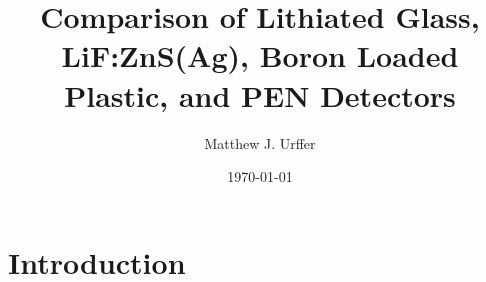 \documentclass[onecolumn]{IEEEtran}
\begin{document}
\title{Comparison of Lithiated Glass, LiF:ZnS(Ag), Boron Loaded Plastic, and PEN Detectors}
\author{Matthew J. Urffer}
\date{\today}
\maketitle

\tableofcontents
\listoffigures
\listoftables
\section{Introduction}
\end{document}
